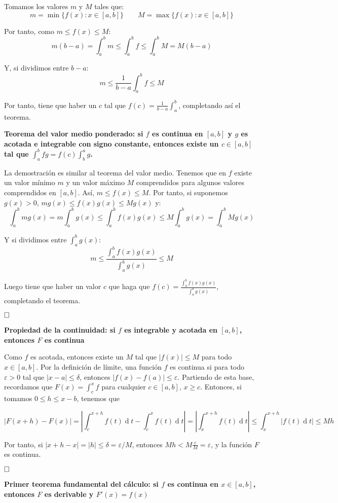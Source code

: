 \documentclass[a4paper]{article}
\renewcommand{\d}[1]{\ensuremath{\operatorname{d}\!{#1}}}
\newcommand{\qed}{\begin{flushright}
		{$\newline\square$}
	\end{flushright}}
\begin{document}
Tomamos los valores $m$ y $M$ tales que:
$$m = \min\{f(x):x\in[a,b]\}\qquad M = \max\{f(x):x\in[a,b]\}$$

Por tanto, como $m\le f(x) \le M$:
$$m(b-a) =  \int_a^b m \le \int_a^b f \le \int_a^b M = M(b-a)$$

Y, si dividimos entre $b-a$:
$$m \le \frac{1}{b-a} \int_a^b f \le  M$$

Por tanto, tiene que haber un $c$ tal que $f(c) = \frac{1}{b-a}\int_a^b$, completando así el teorema.

\textbf{Teorema del valor medio ponderado: si $f$ es continua en $[a,b]$ y $g$ es acotada e integrable con signo constante, entonces existe un $c \in [a,b]$ tal que $\int_a^bfg = f(c)\int_b^ag$.}

La demostración es similar al teorema del valor medio. Tenemos que en $f$ existe un valor mínimo $m$ y un valor máximo $M$ comprendidos para algunos valores comprendidos en $[a,b]$. Así, $m\le f(x)\le M$. Por tanto, si suponemos $g(x)>0$, $mg(x) \le f(x)g(x) \le Mg(x)$ y:
\[ \int_a^b mg(x) = m \int_a^bg(x) \le \int_a^b f(x)g(x) \le M \int_a^b g(x) = \int_a^b Mg(x)  \]

Y si dividimos entre $\int_a^b g(x)$:
\[  m  \le \frac{\int_a^b f(x)g(x)}{\int_a^bg(x)} \le M   \]

Luego tiene que haber un valor $c$ que haga que $f(c) = \frac{\int_a^b f(x)g(x)}{\int_a^bg(x)}$, completando el teorema.\qed

\textbf{Propiedad de la continuidad: si $f$ es integrable y acotada en $[a,b]$, entonces $F$ es continua}

Como $f$ es acotada, entonces existe un $M$ tal que $|f(x)| \le M$ para todo $x \in [a,b]$. Por la definición de límite, una función $f$ es continua si para todo $\varepsilon> 0$ tal que $|x-a| \le \delta$, entonces $|f(x) - f(a)| \le \varepsilon $. Partiendo de esta base, recordamos que $F(x) = \int_c^xf$ para cualquier $c \in [a,b]$, $x\ge c$. Entonces, si tomamos $0 \le h \le x-b$, tenemos que 

\[ |F(x+h) - F(x)| = \left|\int_c^{x+h} f(t)\d t - \int_c^xf(t)\d t\right| = \left|\int_x^{x+h}f(t)\d t\right| \le \int_x^{x+h}|f(t)\d t| \le Mh \]

Por tanto, si $|x+h-x| = |h| \le \delta = \varepsilon/M$, entonces $Mh < M\frac{\varepsilon}{M} = \varepsilon$, y la función $F$ es continua. \qed

\textbf{Primer teorema fundamental del cálculo: si $f$ es continua en $x\in[a,b]$, entonces $F$ es derivable y $F'(x) = f(x)$}
\end{document}
